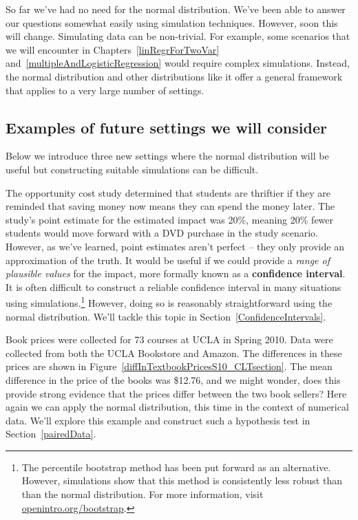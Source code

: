 So far we've had no need for the normal distribution. We've been able to answer our questions somewhat easily using simulation techniques. However, soon this will change. Simulating data can be non-trivial. For example, some scenarios that we will encounter in Chapters~\ref{linRegrForTwoVar} and~\ref{multipleAndLogisticRegression} would require complex simulations. Instead, the normal distribution and other distributions like it offer a general framework that applies to a very large number of settings.


\subsection{Examples of future settings we will consider}

Below we introduce three new settings where the normal distribution will be useful but constructing suitable simulations can be difficult.

\begin{example}{The opportunity cost study determined that students are thriftier if they are reminded that saving money now means they can spend the money later. The study's point estimate for the estimated impact was 20\%, meaning 20\% fewer students would move forward with a DVD purchase in the study scenario. However, as we've learned, point estimates aren't perfect -- they only provide an approximation of the truth.}
It would be useful if we could provide a \emph{range of plausible values} for the impact, more formally known as a \textbf{confidence interval}. It is often difficult to construct a reliable confidence interval in many situations using simulations.\footnote{The percentile bootstrap method has been put forward as an alternative. However, simulations show that this method is consistently less robust than than the normal distribution. For more information, visit \href{http://openintro.org/bootstrap}{openintro.org/bootstrap}.} However, doing so is reasonably straightforward using the normal distribution. We'll tackle this topic in Section~\ref{ConfidenceIntervals}.
\end{example}

\begin{example}{Book prices were collected for 73 courses at UCLA in Spring 2010. Data were collected from both the UCLA Bookstore and Amazon. The differences in these prices are shown in Figure~\ref{diffInTextbookPricesS10_CLTsection}. The mean difference in the price of the books was \$12.76, and we might wonder, does this provide strong evidence that the prices differ between the two book sellers?}
Here again we can apply the normal distribution, this time in the context of numerical data. We'll explore this example and construct such a hypothesis test in Section~\ref{pairedData}.
\end{example}

